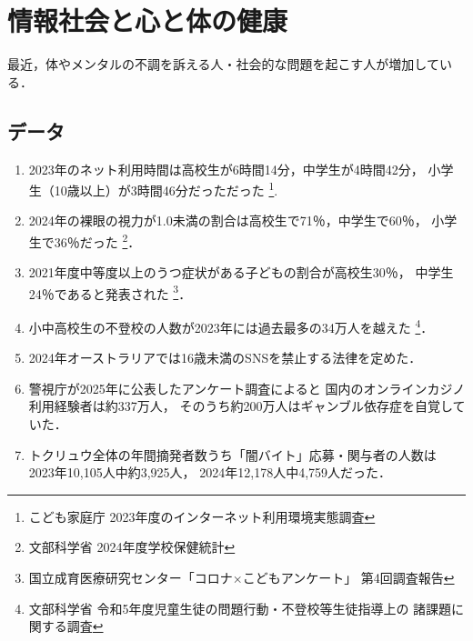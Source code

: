 \section{情報社会と心と体の健康}
最近，体やメンタルの不調を訴える人・社会的な問題を起こす人が増加している．

%
%
%
%
%
%
%
%
%
%
%
%
\emptyline

\subsection{データ}
\begin{enumerate}
   \item 
   2023年のネット利用時間は高校生が6時間14分，中学生が4時間42分，
   小学生（10歳以上）が3時間46分だっただった
   \footnote{こども家庭庁 2023年度のインターネット利用環境実態調査}.
   
   \item 
   2024年の裸眼の視力が1.0未満の割合は高校生で71％，中学生で60％，
   小学生で36％だった
   \footnote{文部科学省 2024年度学校保健統計}．
   
   \item 
   2021年度中等度以上のうつ症状がある子どもの割合が高校生30％，
   中学生24％であると発表された
   \footnote{国立成育医療研究センター「コロナ×こどもアンケート」
   第4回調査報告}．
   
   \item 
   小中高校生の不登校の人数が2023年には過去最多の34万人を越えた
   \footnote{文部科学省 令和5年度児童生徒の問題行動・不登校等生徒指導上の
   諸課題に関する調査}．
   
   \item 
   2024年オーストラリアでは16歳未満のSNSを禁止する法律を定めた．

   \item 
   警視庁が2025年に公表したアンケート調査によると
   国内のオンラインカジノ利用経験者は約337万人，
   そのうち約200万人はギャンブル依存症を自覚していた．
   \item 
   トクリュウ全体の年間摘発者数うち「闇バイト」応募・関与者の人数は
   2023年10,105人中約3,925人，
   2024年12,178人中4,759人だった．
\end{enumerate}
\emptyline


